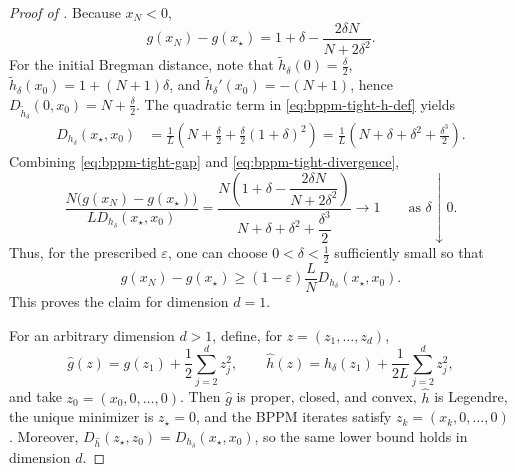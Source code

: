 \documentclass{article}
\theoremstyle{definition}
\theoremstyle{plain}
\newcommand{\bregprox}{g}
\begin{document}
\begin{proof}[Proof of ]
Because $x_N<0$,
\begin{equation}
    \bregprox(x_N)-\bregprox(x_\star)
    =
    1+\delta-\frac{2\delta N}{N+2\delta^2}.
    \label{eq:bppm-tight-gap}
\end{equation}
For the initial Bregman distance, note that $\widetilde h_\delta(0)=\frac{\delta}{2}$, $\widetilde h_\delta(x_0)=1+(N+1)\delta$, and $\widetilde h_\delta'(x_0)=-(N+1)$, hence $D_{\widetilde h_\delta}(0,x_0)=N+\frac{\delta}{2}$.
The quadratic term in \eqref{eq:bppm-tight-h-def} yields
\begin{equation}
\begin{aligned}
    D_{h_\delta}(x_\star,x_0)
    &=
    \frac{1}{L}\left(
        N+\frac{\delta}{2}
        +\frac{\delta}{2}(1+\delta)^2
    \right)
    =
    \frac{1}{L}\left(
        N+\delta+\delta^2+\frac{\delta^3}{2}
    \right).
\end{aligned}
\label{eq:bppm-tight-divergence}
\end{equation}
Combining \eqref{eq:bppm-tight-gap} and \eqref{eq:bppm-tight-divergence},
\[
\frac{N\bigl(\bregprox(x_N)-\bregprox(x_\star)\bigr)}
     {L D_{h_\delta}(x_\star,x_0)}
=
\frac{N\left(1+\delta-\dfrac{2\delta N}{N+2\delta^2}\right)}
     {N+\delta+\delta^2+\dfrac{\delta^3}{2}}
\longrightarrow 1
\qquad\text{as }\delta\downarrow0.
\]
Thus, for the prescribed $\varepsilon$, one can choose $0<\delta<\frac12$ sufficiently small so that
\[
    \bregprox(x_N)-\bregprox(x_\star)
    \ge
    (1-\varepsilon)\frac{L}{N}D_{h_\delta}(x_\star,x_0).
\]
This proves the claim for dimension $d=1$.

For an arbitrary dimension $d>1$, define, for $z=(z_1,\ldots,z_d)$,
\[
    \widehat{\bregprox}(z)=\bregprox(z_1)+\frac12\sum_{j=2}^d z_j^2,
    \qquad
    \widehat h(z)=h_\delta(z_1)+\frac{1}{2L}\sum_{j=2}^d z_j^2,
\]
and take $z_0=(x_0,0,\ldots,0)$.
Then $\widehat{\bregprox}$ is proper, closed, and convex, $\widehat h$ is Legendre, the unique minimizer is $z_\star=0$, and the BPPM iterates satisfy $z_k=(x_k,0,\ldots,0)$.
Moreover, $D_{\widehat h}(z_\star,z_0)=D_{h_\delta}(x_\star,x_0)$, so the same lower bound holds in dimension $d$.
\end{proof}
\end{document}
